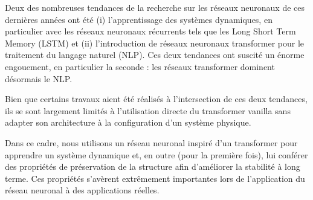 Deux des nombreuses tendances de la recherche sur les réseaux neuronaux de ces dernières années ont été (i) l'apprentissage des systèmes dynamiques, en particulier avec les réseaux neuronaux récurrents tels que les Long Short Term Memory (LSTM) et (ii) l'introduction de réseaux neuronaux transformer pour le traitement du langage naturel (NLP). Ces deux tendances ont suscité un énorme engouement, en particulier la seconde : les réseaux transformer dominent désormais le NLP. 

Bien que certains travaux aient été réalisés à l'intersection de ces deux tendances, ils se sont largement limités à l'utilisation directe du transformer vanilla sans adapter son architecture à la configuration d'un système physique.
    
Dans ce cadre, nous utilisons un réseau neuronal inspiré d'un transformer pour apprendre un système dynamique et, en outre (pour la première fois), lui conférer des propriétés de préservation de la structure afin d'améliorer la stabilité à long terme. Ces propriétés s'avèrent extrêmement importantes lors de l'application du réseau neuronal à des applications réelles.